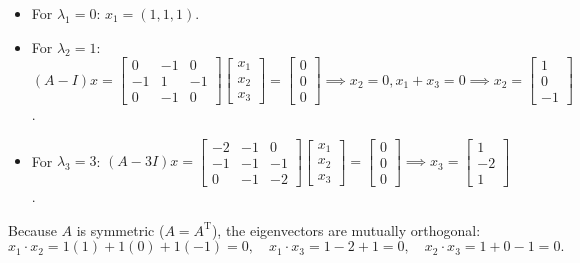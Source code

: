 \documentclass[11pt,a4paper,openany,oneside]{book}
\def\vect#1{#1}%
\def\mathbf#1{#1}%
\newcommand{\vect}[1]{\mathbf{#1}}
\newcommand{\T}{\mathrm{T}}
\numberwithin{equation}{chapter}
\begin{document}
\begin{itemize}
\item For $\lambda_1 = 0$: $\vect{x}_1 = (1, 1, 1)$.
\item For $\lambda_2 = 1$: $(A - I)\vect{x} = \begin{bmatrix} 0 & -1 & 0 \\ -1 & 1 & -1 \\ 0 & -1 & 0 \end{bmatrix}\begin{bmatrix} x_1 \\ x_2 \\ x_3 \end{bmatrix} = \begin{bmatrix} 0 \\ 0 \\ 0 \end{bmatrix} \implies x_2 = 0, x_1 + x_3 = 0 \implies \vect{x}_2 = \begin{bmatrix} 1 \\ 0 \\ -1 \end{bmatrix}$.
\item For $\lambda_3 = 3$: $(A - 3I)\vect{x} = \begin{bmatrix} -2 & -1 & 0 \\ -1 & -1 & -1 \\ 0 & -1 & -2 \end{bmatrix}\begin{bmatrix} x_1 \\ x_2 \\ x_3 \end{bmatrix} = \begin{bmatrix} 0 \\ 0 \\ 0 \end{bmatrix} \implies \vect{x}_3 = \begin{bmatrix} 1 \\ -2 \\ 1 \end{bmatrix}$.
\end{itemize}
Because $A$ is symmetric ($A = A^\T$), the eigenvectors are mutually orthogonal:
\[
\vect{x}_1\cdot\vect{x}_2 = 1(1) + 1(0) + 1(-1) = 0, \quad \vect{x}_1\cdot\vect{x}_3 = 1 - 2 + 1 = 0, \quad \vect{x}_2\cdot\vect{x}_3 = 1 + 0 - 1 = 0.
\]
\end{document}
